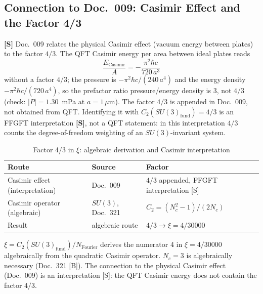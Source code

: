 \subsection{Connection to Doc.~009: Casimir Effect and the Factor 4/3}

\textbf{[S]} Doc.~009 relates the physical Casimir effect (vacuum energy
between plates) to the factor $4/3$. The QFT Casimir energy per area
between ideal plates reads
\begin{equation}
  \frac{E_{\text{Casimir}}}{A} = -\frac{\pi^2\hbar c}{720\,a^3}
  \label{eq:casimir_eff}
\end{equation}
without a factor $4/3$; the pressure is $-\pi^2\hbar c/(240\,a^4)$ and the
energy density $-\pi^2\hbar c/(720\,a^4)$, so the prefactor ratio
pressure/energy density is $3$, not $4/3$ (check: $|P| = 1.30$~mPa at
$a = 1\,\mu$m). The factor $4/3$ is appended in Doc.~009, not obtained from
QFT. Identifying it with $C_2(SU(3)_{\text{fund}}) = 4/3$ is an FFGFT
interpretation \textbf{[S]}, not a QFT statement: in this interpretation
$4/3$ counts the degree-of-freedom weighting of an $SU(3)$-invariant system.

\begin{table}[h]
\centering
\caption{Factor 4/3 in $\xi$: algebraic derivation and Casimir interpretation}
\label{tab:casimir_wege}
\begin{tabular}{lll}
\toprule
Route & Source & Factor \\
\midrule
Casimir effect (interpretation) & Doc.~009 & $4/3$ appended, FFGFT interpretation [S] \\
Casimir operator (algebraic) & $SU(3)$, Doc.~321 & $C_2 = (N_c^2-1)/(2N_c)$ \\
\midrule
Result & algebraic route & $4/3 \to \xi = 4/30000$ \\
\bottomrule
\end{tabular}
\end{table}

\begin{keyresult}
$\xi = C_2(SU(3)_{\text{fund}})/N_{\text{Fourier}}$ derives the
numerator 4 in $\xi = 4/30000$ algebraically from the quadratic
Casimir operator. $N_c = 3$ is algebraically necessary (Doc.~321 [B]).
The connection to the physical Casimir effect (Doc.~009) is an
interpretation [S]: the QFT Casimir energy does not contain the factor $4/3$.
\end{keyresult}

